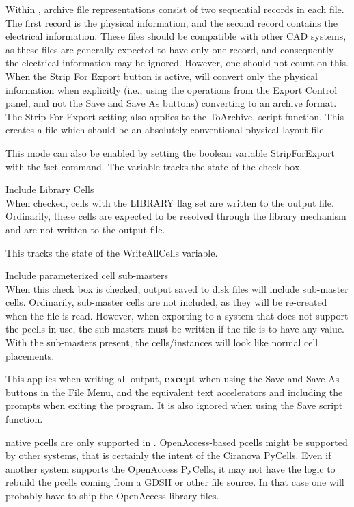 \begin{description}
Within {\Xic}, archive file representations consist of two sequential
records in each file.  The first record is the physical information,
and the second record contains the electrical information.  These
files should be compatible with other CAD systems, as these files are
generally expected to have only one record, and consequently the
electrical information may be ignored.  However, one should not count
on this.  When the {\cb Strip For Export} button is active, {\Xic}
will convert only the physical information when explicitly (i.e.,
using the operations from the {\cb Export Control} panel, and not
the {\cb Save} and {\cb Save As} buttons) converting to an archive
format.  The {\cb Strip For Export} setting also applies to the {\vt
ToArchive}, script function.  This creates a file which should be an
absolutely conventional physical layout file.

This mode can also be enabled by setting the boolean variable {\et
StripForExport} with the {\cb !set} command.  The variable tracks the
state of the check box.

\item{\cb Include Library Cells}\\
When checked, cells with the LIBRARY flag set are written to the
output file.  Ordinarily, these cells are expected to be resolved
through the library mechanism and are not written to the output file.

This tracks the state of the {\et WriteAllCells} variable.

\item{\cb Include parameterized cell sub-masters}\\
When this check box is checked, output saved to disk files will
include sub-master cells.  Ordinarily, sub-master cells are not
included, as they will be re-created when the file is read.  However,
when exporting to a system that does not support the pcells in use,
the sub-masters must be written if the file is to have any value. 
With the sub-masters present, the cells/instances will look like
normal cell placements.

This applies when writing all output, {\bf except} when using the {\cb
Save} and {\cb Save As} buttons in the {\cb File Menu}, and the
equivalent text accelerators and including the prompts when exiting
the program.  It is also ignored when using the {\vt Save} script
function.

\ifoa
{\Xic} native pcells are only supported in {\Xic}.  OpenAccess-based
pcells might be supported by other systems, that is certainly the
intent of the Ciranova PyCells.  Even if another system supports the
OpenAccess PyCells, it may not have the logic to rebuild the pcells
coming from a GDSII or other file source.  In that case one will
probably have to ship the OpenAccess library files.
\fi


\end{description}
